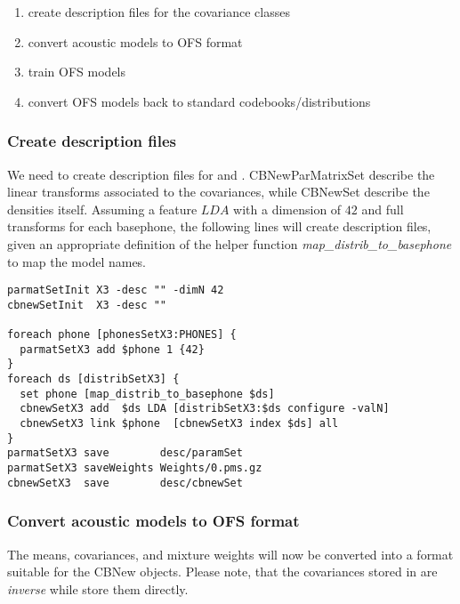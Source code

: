 \begin{enumerate}
\item create description files for the covariance classes
\item convert acoustic models to OFS format
\item train OFS models
\item convert OFS models back to standard codebooks/distributions
\end{enumerate}

\subsubsection{Create description files}

We    need        to     create     description         files      for
      and     .
CBNewParMatrixSet describe  the  linear transforms associated  to  the
covariances, while CBNewSet describe the densities itself.  Assuming a
feature  $LDA$ with a dimension of  $42$ and  full transforms for each
basephone, the following lines will create description files, given an
appropriate    definition   of      the      helper   function    {\em
map\_distrib\_to\_basephone} to map the model names.

\begin{verbatim}
parmatSetInit X3 -desc "" -dimN 42
cbnewSetInit  X3 -desc ""

foreach phone [phonesSetX3:PHONES] { 
  parmatSetX3 add $phone 1 {42} 
}
foreach ds [distribSetX3] {
  set phone [map_distrib_to_basephone $ds]
  cbnewSetX3 add  $ds LDA [distribSetX3:$ds configure -valN]
  cbnewSetX3 link $phone  [cbnewSetX3 index $ds] all
}
parmatSetX3 save        desc/paramSet
parmatSetX3 saveWeights Weights/0.pms.gz
cbnewSetX3  save        desc/cbnewSet
\end{verbatim}

\subsubsection{Convert acoustic models to OFS format}

The means, covariances, and mixture weights will now be converted into
a  format suitable for  the   CBNew  objects. Please  note, that   the
covariances stored  in  are {\em inverse} while
 store them directly.

